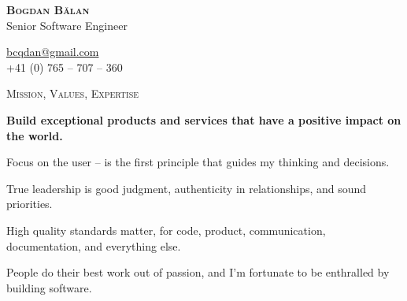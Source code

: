 \documentclass[11pt]{article}
\begin{document}
\pagestyle{empty}
\begin{multicols}{2}
  \noindent 
  \textcolor{Primary}{\textbf {\huge \textsc{Bogdan Bălan}}}\\
  Senior Software Engineer

  \columnbreak
  \raggedleft
  \href{mailto:bcqdan@gmail.com}{bcqdan@gmail.com}\\
  +41 (0) 765 -- 707 -- 360
\end{multicols}

\vspace{0.12in}
\noindent
\textcolor{Primary}{{\large \textsc{Mission, Values, Expertise}}}

\begin{list}{}{\leftmargin=0em}
  \setlength{\itemsep}{1pt}
  \setlength{\parskip}{0pt}
  \setlength{\parsep}{0pt}

\item
{\bf Build exceptional products and services that have a positive impact on the world.}
\item
Focus on the user -- is the first principle that guides my thinking and decisions.
\item
True leadership is good judgment, authenticity in relationships, and sound priorities.
\item
High quality standards matter, for code, product, communication, documentation, and everything else.
\item
People do their best work out of passion, and I'm fortunate to be enthralled by building software.

\end{list}
\end{document}
